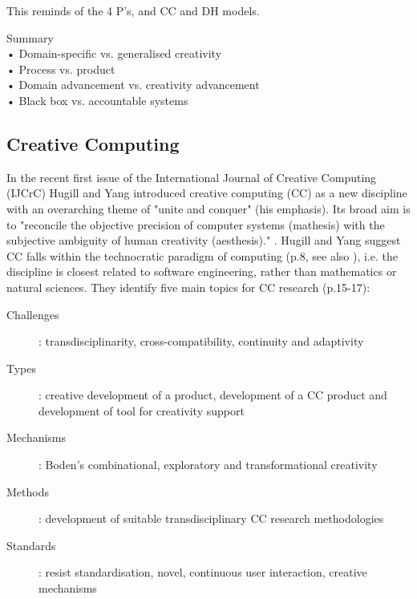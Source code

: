 \begin{draft}
  This reminds of the 4 P’s, and CC and DH models.
\end{draft}

\begin{shaded}
  Summary\\
  •	Domain-specific vs. generalised creativity\\
  •	Process vs. product\\
  •	Domain advancement vs. creativity advancement\\
  •	Black box vs. accountable systems
\end{shaded}


\subsection{Creative Computing}


In the recent first issue of the International Journal of Creative Computing (IJCrC) Hugill and Yang introduced creative computing (CC) as a new discipline \citep{Hugill2013c} with an overarching theme of "unite and conquer" \citep[p.1]{Yang2013}(his emphasis). Its broad aim is to "reconcile the objective precision of computer systems (mathesis) with the subjective ambiguity of human creativity (aesthesis)." \citep[p.5]{Hugill2013c}. Hugill and Yang suggest CC falls within the technocratic paradigm of computing (p.8, see also \citep{Eden2007}), i.e. the discipline is closest related to software engineering, rather than mathematics or natural sciences. They identify five main topics for CC research (p.15-17):

\begin{description}
  \item [Challenges]: transdisciplinarity, cross-compatibility, continuity and adaptivity
  \item [Types]: creative development of a product, development of a CC product and development of tool for creativity support
  \item [Mechanisms]:	Boden’s combinational, exploratory and transformational creativity
  \item [Methods]: development of suitable transdisciplinary CC research methodologies
  \item [Standards]: resist standardisation, novel, continuous user interaction, creative mechanisms
\end{description}

